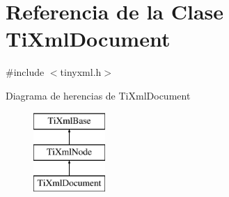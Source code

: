 \hypertarget{class_ti_xml_document}{\section{Referencia de la Clase Ti\-Xml\-Document}
\label{class_ti_xml_document}
}


{\ttfamily \#include $<$tinyxml.\-h$>$}

Diagrama de herencias de Ti\-Xml\-Document\begin{figure}[H]
\begin{center}
\leavevmode
\includegraphics[height=3.000000cm]{class_ti_xml_document}
\end{center}
\end{figure}
